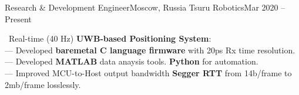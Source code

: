 \resumeSubheading
  {Research \& Development Engineer}{Moscow, Russia}
  {Tsuru Robotics}{Mar 2020 -- Present}
  \begin{itemize}[leftmargin=0in, label={}]
    \small{\item{
      {\textbullet \ Real-time (40 Hz) \textbf{UWB-based Positioning System}:}\\
      {— Developed \textbf{baremetal C language firmware} with 20ps Rx time resolution.}\\
      {— Developed \textbf{MATLAB} data anaysis tools. \textbf{Python} for automation.}\\
      {— Improved MCU-to-Host output bandwidth \textbf{Segger RTT} from 14b/frame to 2mb/frame losslessly.}\\
    }}
  \end{itemize}